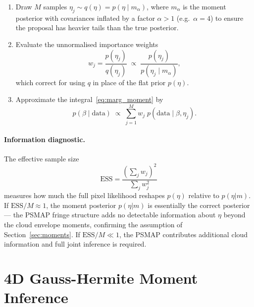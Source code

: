 \documentclass[11pt,a4paper]{article}
\begin{document}
\begin{enumerate}
  \item Draw $M$ samples $\eta_j \sim q(\eta) = p(\eta \mid m_\alpha)$, where
        $m_\alpha$ is the moment posterior with covariances inflated by a
        factor $\alpha > 1$ (e.g.\ $\alpha = 4$) to ensure the proposal has
        heavier tails than the true posterior.

  \item Evaluate the unnormalised importance weights
        \begin{equation}
          w_j = \frac{p(\eta_j)}{q(\eta_j)}
              \;\propto\;
              \frac{p(\eta_j)}{p(\eta_j \mid m_\alpha)},
          \label{eq:isweights}
        \end{equation}
        which correct for using $q$ in place of the flat prior $p(\eta)$.

  \item Approximate the integral~\eqref{eq:marg_moment} by
        \begin{equation}
          p(\beta \mid \text{data})
          \;\propto\;
          \sum_{j=1}^M w_j\;p(\text{data} \mid \beta, \eta_j).
          \label{eq:isapprox}
        \end{equation}
\end{enumerate}

\paragraph{Information diagnostic.}
The effective sample size
\begin{equation}
  \mathrm{ESS} = \frac{(\sum_j w_j)^2}{\sum_j w_j^2}
  \label{eq:ess}
\end{equation}
measures how much the full pixel likelihood reshapes $p(\eta)$ relative to
$p(\eta|m)$.  If $\mathrm{ESS}/M \approx 1$, the moment posterior
$p(\eta|m)$ is essentially the correct posterior — the PSMAP fringe structure
adds no detectable information about $\eta$ beyond the cloud envelope moments,
confirming the assumption of Section~\ref{sec:moments}.  If
$\mathrm{ESS}/M \ll 1$, the PSMAP contributes additional cloud information
and full joint inference is required.

\section{4D Gauss-Hermite Moment Inference}
\label{sec:gh4d}
\end{document}
